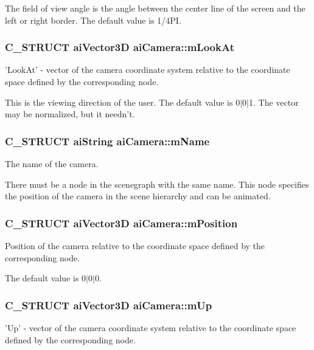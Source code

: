 The field of view angle is the angle between the center line of the screen and the left or right border. The default value is 1/4\+P\+I. \hypertarget{structai_camera_af9463249ac870e030fa435b1186cef23}{
\subsubsection[{m\+Look\+At}]{\setlength{\rightskip}{0pt plus 5cm}C\+\_\+\+S\+T\+R\+U\+C\+T {\bf ai\+Vector3\+D} ai\+Camera\+::m\+Look\+At}}\label{structai_camera_af9463249ac870e030fa435b1186cef23}
'Look\+At' -\/ vector of the camera coordinate system relative to the coordinate space defined by the corresponding node.

This is the viewing direction of the user. The default value is 0$\vert$0$\vert$1. The vector may be normalized, but it needn't. \hypertarget{structai_camera_aa6a5fe5e04b3db1b23f69eb9910c6816}{
\subsubsection[{m\+Name}]{\setlength{\rightskip}{0pt plus 5cm}C\+\_\+\+S\+T\+R\+U\+C\+T {\bf ai\+String} ai\+Camera\+::m\+Name}}\label{structai_camera_aa6a5fe5e04b3db1b23f69eb9910c6816}
The name of the camera.

There must be a node in the scenegraph with the same name. This node specifies the position of the camera in the scene hierarchy and can be animated. \hypertarget{structai_camera_a518617ea192ca0698e748a4399e7c3a5}{
\subsubsection[{m\+Position}]{\setlength{\rightskip}{0pt plus 5cm}C\+\_\+\+S\+T\+R\+U\+C\+T {\bf ai\+Vector3\+D} ai\+Camera\+::m\+Position}}\label{structai_camera_a518617ea192ca0698e748a4399e7c3a5}
Position of the camera relative to the coordinate space defined by the corresponding node.

The default value is 0$\vert$0$\vert$0. \hypertarget{structai_camera_a7fb42b287389b4f99c883098268d6d1a}{
\subsubsection[{m\+Up}]{\setlength{\rightskip}{0pt plus 5cm}C\+\_\+\+S\+T\+R\+U\+C\+T {\bf ai\+Vector3\+D} ai\+Camera\+::m\+Up}}\label{structai_camera_a7fb42b287389b4f99c883098268d6d1a}
'Up' -\/ vector of the camera coordinate system relative to the coordinate space defined by the corresponding node.


